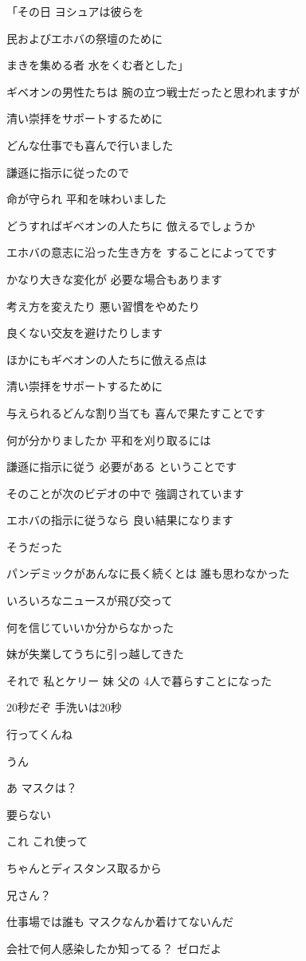 \documentclass[twocolumn]{jsarticle}
\begin{document}
「その日 ヨシュアは彼らを

民およびエホバの祭壇のために

まきを集める者 水をくむ者とした」

ギベオンの男性たちは
腕の立つ戦士だったと思われますが

清い崇拝をサポートするために

どんな仕事でも喜んで行いました

謙遜に指示に従ったので

命が守られ 平和を味わいました

どうすればギベオンの人たちに
倣えるでしょうか

エホバの意志に沿った生き方を
することによってです

かなり大きな変化が
必要な場合もあります

考え方を変えたり 悪い習慣をやめたり

良くない交友を避けたりします

ほかにもギベオンの人たちに倣える点は

清い崇拝をサポートするために

与えられるどんな割り当ても
喜んで果たすことです

何が分かりましたか
平和を刈り取るには

謙遜に指示に従う
必要がある ということです

そのことが次のビデオの中で
強調されています

エホバの指示に従うなら
良い結果になります

そうだった

パンデミックがあんなに長く続くとは
誰も思わなかった

いろいろなニュースが飛び交って

何を信じていいか分からなかった

妹が失業してうちに引っ越してきた

それで 私とケリー 妹 父の
4人で暮らすことになった

20秒だぞ 手洗いは20秒

行ってくんね

うん

あ マスクは？

要らない

これ これ使って

ちゃんとディスタンス取るから

兄さん？

仕事場では誰も
マスクなんか着けてないんだ

会社で何人感染したか知ってる？
ゼロだよ
\end{document}
